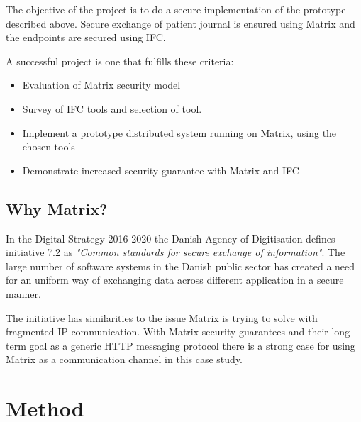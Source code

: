 
The objective of the project is to do a secure implementation of the prototype described above. Secure exchange of patient journal is ensured using Matrix and the endpoints are secured using IFC.

A successful project is one that fulfills these criteria: 

\begin{itemize}
	\item Evaluation of Matrix security model
	\item Survey of IFC tools and selection of tool.
	\item Implement a prototype distributed system running on Matrix, using the chosen tools
	\item Demonstrate increased security guarantee with Matrix and IFC
\end{itemize}   


\subsection{Why Matrix?}
In the Digital Strategy 2016-2020 the Danish Agency of Digitisation defines initiative 7.2 as \emph{"Common standards for secure exchange of information"}. The large number of software systems in the Danish public sector has created a need for an uniform way of exchanging data across different application in a secure manner\cite{TheGovernment2016}. 

The initiative has similarities to the issue Matrix is trying to solve with fragmented IP communication. With Matrix security guarantees and their long term goal as a generic HTTP messaging protocol there is a strong case for using Matrix as a communication channel in this case study.


 
\section{Method}
 
